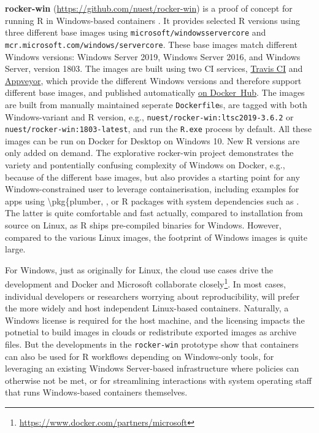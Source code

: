 \textbf{rocker-win} (\url{https://github.com/nuest/rocker-win}) is a
proof of concept for running R in Windows-based containers
\citep{nust_rocker-win_2019}. It provides selected R versions using
three different base images using \texttt{microsoft/windowsservercore}
and \texttt{mcr.microsoft.com/windows/servercore}. These base images
match different Windows versions: Windows Server 2019, Windows Server
2016, and Windows Server, version 1803. The images are built using two
CI services,
\href{https://docs.travis-ci.com/user/reference/windows/}{Travis CI} and
\href{https://www.appveyor.com/docs/windows-images-software/}{Appveyor},
which provide the different Windows versions and therefore support
different base images, and published automatically
\href{https://hub.docker.com/r/nuest/rocker-win}{on Docker~Hub}. The
images are built from manually maintained seperate \texttt{Dockerfile}s,
are tagged with both Windows-variant and R version, e.g.,
\texttt{nuest/rocker-win:ltsc2019-3.6.2} or
\texttt{nuest/rocker-win:1803-latest}, and run the \texttt{R.exe}
process by default. All these images can be run on Docker for Desktop on
Windows 10. New R versions are only added on demand. The explorative
rocker-win project demonstrates the variety and pontentially confusing
complexity of Windows on Docker, e.g., because of the different base
images, but also provides a starting point for any Windows-constrained
user to leverage containerisation, including examples for apps using
\textbackslash{}pkg\{plumber, , or R packages with system
dependencies such as . The latter is quite comfortable and fast
actually, compared to installation from source on Linux, as R ships
pre-compiled binaries for Windows. However, compared to the various
Linux images, the footprint of Windows images is quite large.

For Windows, just as originally for Linux, the cloud use cases drive the
development and Docker and Microsoft collaborate
closely\footnote{\href{https://www.docker.com/partners/microsoft}{https://www.docker.com/partners/microsoft}}.
In most cases, individual developers or researchers worrying about
reproducibility, will prefer the more widely and host independent
Linux-based containers. Naturally, a Windows license is required for the
host machine, and the licensing impacts the potnetial to build images in
clouds or redistribute exported images as archive files. But the
developments in the \texttt{rocker-win} prototype show that containers
can also be used for R workflows depending on Windows-only tools, for
leveraging an existing Windows Server-based infrastructure where
policies can otherwise not be met, or for streamlining interactions with
system operating staff that runs Windows-based containers themselves.

